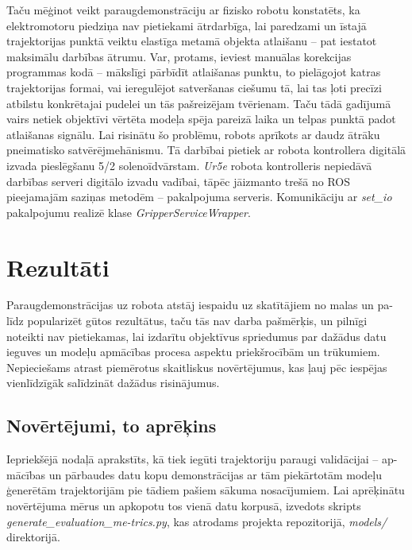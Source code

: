 \documentclass[12pt, a4paper]{article}
\numberwithin{equation}{section} %
\begin{document}
Taču mēģinot veikt paraugdemonstrāciju ar fizisko robotu konstatēts, ka elektromotoru piedziņa nav pietiekami ātrdarbīga, lai paredzami un īstajā trajektorijas punktā veiktu elastīga metamā objekta atlaišanu -- pat iestatot maksimālu darbības ātrumu. Var, protams, ieviest manuālas korekcijas programmas kodā -- mākslīgi pārbīdīt atlaišanas punktu, to pielāgojot katras trajektorijas formai, vai ieregulējot satveršanas ciešumu tā, lai tas ļoti precīzi atbilstu konkrētajai pudelei un tās pašreizējam tvērienam. Taču tādā gadījumā vairs netiek objektīvi vērtēta modeļa spēja pareizā laika un telpas punktā padot atlaišanas signālu. Lai risinātu šo problēmu, robots aprīkots ar daudz ātrāku pneimatisko satvērējmehānismu. Tā darbībai pietiek ar robota kontrollera digitālā izvada pieslēgšanu 5/2 solenoīdvārstam. \textit{Ur5e} robota kontrolleris nepiedāvā darbības serveri digitālo izvadu vadībai, tāpēc jāizmanto trešā no ROS pieejamajām saziņas metodēm -- pakalpojuma serveris. Komunikāciju ar \textit{set\_io} pakalpojumu realizē klase \textit{GripperServiceWrapper}.




%
%
%
%
%
%
%
%
%
%
%
%
%
%
%
%
%
%
%

\newpage
\section{Rezultāti}

Paraugdemonstrācijas uz robota atstāj iespaidu uz skatītājiem no malas un pa-līdz popularizēt gūtos rezultātus, taču tās nav darba pašmērķis, un pilnīgi noteikti nav pietiekamas, lai izdarītu objektīvus spriedumus par dažādus datu ieguves un modeļu apmācības procesa aspektu priekšrocībām un trūkumiem. Nepieciešams atrast piemērotus skaitliskus novērtējumus, kas ļauj pēc iespējas vienlīdzīgāk salīdzināt dažādus risinājumus.

\subsection{Novērtējumi, to aprēķins}

Iepriekšējā nodaļā aprakstīts, kā tiek iegūti trajektoriju paraugi validācijai -- ap-mācības un pārbaudes datu kopu demonstrācijas ar tām piekārtotām modeļu ģenerētām trajektorijām pie tādiem pašiem sākuma nosacījumiem. Lai aprēķinātu novērtējuma mērus un apkopotu tos vienā datu korpusā, izvedots skripts \textit{generate\_evaluation\_me-trics.py}, kas atrodams projekta repozitorijā, \textit{models/} direktorijā.
\end{document}
